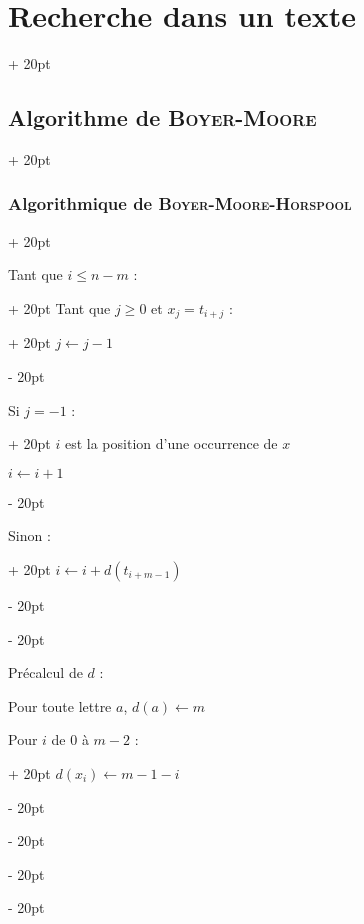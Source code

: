 \documentclass[a4paper, 12pt, twoside]{article}
\renewcommand{\le}{\leqslant}
\renewcommand{\ge}{\geqslant}
\newcommand{\ind}[1][20pt]{\advance\leftskip + #1}
\newcommand{\deind}[1][20pt]{\advance\leftskip - #1}
\newenvironment{indt}[2][20pt]{#2 \par \ind[#1]}{\par \deind} %
\begin{document}
\begin{indt}{\section{Recherche dans un texte}}
\begin{indt}{\subsection{Algorithme de \textsc{Boyer-Moore}}}
\begin{indt}{\subsubsection{Algorithmique de \textsc{Boyer-Moore-Horspool}}}
\begin{pseudocode}
\begin{indt}{Tant que $i \le n - m$ :}
                        \begin{indt}{Tant que $j \ge 0$ et $x_j = t_{i + j}$ :}
                            $j \leftarrow j - 1$
                        \end{indt}
                        
                        \vspace{6pt}

                        \begin{indt}{Si $j = -1$ :}
                            $i$ est la position d'une occurrence de $x$

                            $i \leftarrow i + 1$
                        \end{indt}
                        
                        \vspace{6pt}

                        \begin{indt}{Sinon :}
                            $i \leftarrow i + d(t_{i + m - 1})$
                        \end{indt}
                    \end{indt}
                \end{pseudocode}

                Précalcul de $d$ :

                \begin{pseudocode}
                    Pour toute lettre $a$, $d(a) \leftarrow m$
                        
                    \vspace{6pt}

                    \begin{indt}{Pour $i$ de 0 à $m - 2$ :}
                        $d(x_i) \leftarrow m - 1 - i$
                    \end{indt}
                \end{pseudocode}

                \begin{center}
                \end{center}


\end{indt}
\end{indt}
\end{indt}
\end{document}

